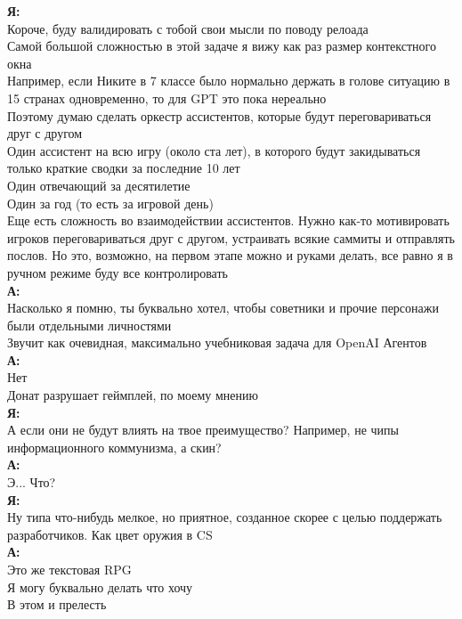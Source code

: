 \textbf{Я:}\\
Короче, буду валидировать с тобой свои мысли по поводу релоада\\
Самой большой сложностью в этой задаче я вижу как раз размер контекстного окна\\
Например, если Никите в 7 классе было нормально держать в голове ситуацию в 15 странах одновременно, то для GPT это пока нереально\\
Поэтому думаю сделать оркестр ассистентов, которые будут переговариваться друг с другом\\
Один ассистент на всю игру (около ста лет), в которого будут закидываться только краткие сводки за последние 10 лет\\
Один отвечающий за десятилетие\\
Один за год (то есть за игровой день)\\
Еще есть сложность во взаимодействии ассистентов. Нужно как-то мотивировать игроков переговариваться друг с другом, устраивать всякие саммиты и отправлять послов. Но это, возможно, на первом этапе можно и руками делать, все равно я в ручном режиме буду все контролировать\\

\textbf{А:}\\
Насколько я помню, ты буквально хотел, чтобы советники и прочие персонажи были отдельными личностями\\
Звучит как очевидная, максимально учебниковая задача для OpenAI Агентов\\

\textbf{А:}\\
Нет\\
Донат разрушает геймплей, по моему мнению\\

\textbf{Я:}\\
А если они не будут влиять на твое преимущество? Например, не чипы информационного коммунизма, а скин?\\

\textbf{А:}\\
Э... Что?\\

\textbf{Я:}\\
Ну типа что-нибудь мелкое, но приятное, созданное скорее с целью поддержать разработчиков. Как цвет оружия в CS\\

\textbf{А:}\\
Это же текстовая RPG\\
Я могу буквально делать что хочу\\
В этом и прелесть\\


